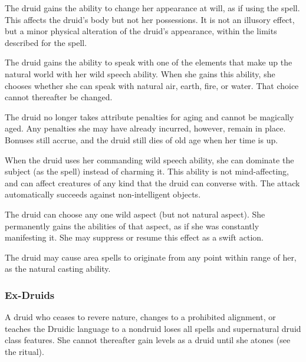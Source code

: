  The druid gains the ability to change her appearance at will, as if using the  spell. This affects the druid's body but not her possessions. It is not an illusory effect, but a minor physical alteration of the druid's appearance, within the limits described for the spell.

 The druid gains the ability to speak with one of the elements that make up the natural world with her wild speech ability. When she gains this ability, she chooses whether she can speak with natural air, earth, fire, or water. That choice cannot thereafter be changed.

 The druid no longer takes attribute penalties for aging and cannot be magically aged. Any penalties she may have already incurred, however, remain in place. Bonuses still accrue, and the druid still dies of old age when her time is up.

 When the druid uses her commanding wild speech ability, she can dominate the subject (as the  spell) instead of charming it. This ability is not mind-affecting, and can affect creatures of any kind that the druid can converse with. The attack automatically succeeds against non-intelligent objects.

 The druid can choose any one wild aspect (but not natural aspect). She permanently gains the abilities of that aspect, as if she was constantly manifesting it. She may suppress or resume this effect as a swift action.

 The druid may cause area spells to originate from any point within \rngmed range of her, as the natural casting ability.

\subsubsection{Ex-Druids}
A druid who ceases to revere nature, changes to a prohibited alignment, or teaches the Druidic language to a nondruid loses all spells and supernatural druid class features. She cannot thereafter gain levels as a druid until she atones (see the  ritual).

